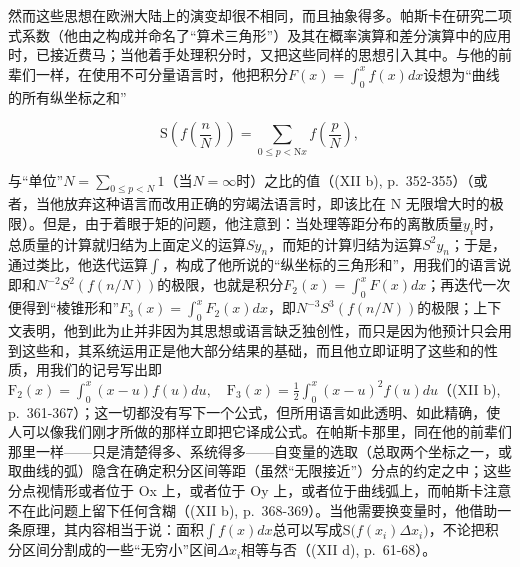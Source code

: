 然而这些思想在欧洲大陆上的演变却很不相同，而且抽象得多。帕斯卡在研究二项式系数（他由之构成并命名了“算术三角形”）及其在概率演算和差分演算中的应用时，已接近费马；当他着手处理积分时，又把这些同样的思想引入其中。与他的前辈们一样，在使用不可分量语言时，他把积分\(F(x) = \int_{0}^{x} f(x) dx\)设想为“曲线的所有纵坐标之和”

\[
\mathrm{S} \left(f \left(\frac {n}{N}\right)\right) = \sum_ {0 \leqslant p <   \mathrm{N} x} f \left(\frac {p}{N}\right),
\]

与“单位”\(N = \sum_{0 \leqslant p < N} 1\)（当\(N = \infty\)时）之比的值（(XII b), p.~352-355）（或者，当他放弃这种语言而改用正确的穷竭法语言时，即该比在 N 无限增大时的极限）。但是，由于着眼于矩的问题，他注意到：当处理等距分布的离散质量\(y_i\)时，总质量的计算就归结为上面定义的运算\(Sy_n\)，而矩的计算归结为运算\(S^2 y_n\)；于是，通过类比，他迭代运算\(\int\)，构成了他所说的“纵坐标的三角形和”，用我们的语言说即和\(N^{-2} S^2(f(n/N))\)的极限，也就是积分\(F_2(x) = \int_0^x F(x) dx\)；再迭代一次便得到“棱锥形和”\(F_3(x) = \int_0^x F_2(x) dx\)，即\(N^{-3} S^3(f(n/N))\)的极限；上下文表明，他到此为止并非因为其思想或语言缺乏独创性，而只是因为他预计只会用到这些和，其系统运用正是他大部分结果的基础，而且他立即证明了这些和的性质，用我们的记号写出即\(\mathrm{F}_{2}(x)=\int_{0}^{x}(x-u)f(u)du,\quad\mathrm{F}_{3}(x)=\frac{1}{2}\int_{0}^{x}(x-u)^{2}f(u)du\)（(XII b), p.~361-367）；这一切都没有写下一个公式，但所用语言如此透明、如此精确，使人可以像我们刚才所做的那样立即把它译成公式。在帕斯卡那里，同在他的前辈们那里一样——只是清楚得多、系统得多——自变量的选取（总取两个坐标之一，或取曲线的弧）隐含在确定积分区间等距（虽然“无限接近”）分点的约定之中；这些分点视情形或者位于 Ox 上，或者位于 Oy 上，或者位于曲线弧上，而帕斯卡注意不在此问题上留下任何含糊（(XII b), p.~368-369）。当他需要换变量时，他借助一条原理，其内容相当于说：面积\(\int f(x)dx\)总可以写成\(\mathrm{S}\big(f(x_{i})\Delta x_{i}\big)\)，不论把积分区间分割成的一些“无穷小”区间\(\Delta x_{i}\)相等与否（(XII d), p.~61-68）。

